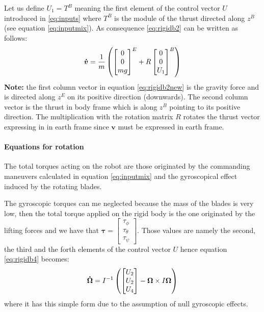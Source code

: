 \noindent
Let us define $U_1 = T^B$ meaning the first element of the control vector $U$ introduced in \eqref{eq:inputs} where $T^B$ is the module of the thrust directed along $z^B$ (see equation \eqref{eq:inputmix}).
As consequence \eqref{eq:rigidb2} can be written as follows:
\vspace{1ex}
\begin{equation}
\vspace{1ex}
\boldsymbol{\dot{v}} = \frac{1}{m}\left(\begin{bmatrix}0\\0\\mg\end{bmatrix}^E + R\begin{bmatrix}0\\0\\U_1\end{bmatrix}^B\right)
\label{eq:rigidb2new}
\end{equation}
\textbf{Note:} the first column vector in equation \eqref{eq:rigidb2new} is the gravity force and is directed along $z^E$ on its positive direction (downwards). The second column vector is the thrust in body frame which is along $z^B$ pointing to its positive direction. The multiplication with the rotation matrix $R$ rotates the thrust vector expressing in in earth frame since $\boldsymbol{v}$ must be expressed in earth frame.\\

\noindent
\paragraph{Equations for rotation}
The total torques acting on the robot are those originated by the commanding maneuvers calculated in equation \eqref{eq:inputmix} and the gyroscopical effect induced by the rotating blades. \par The gyroscopic torques can me neglected because the mass of the blades is very low, then the total torque applied on the rigid body is the one originated by the lifting forces and we have that $\boldsymbol{\tau} = \begin{bmatrix}
\tau_\phi\\\tau_\theta\\\tau_\psi
\end{bmatrix}$. Those values are namely the second, the third and the forth elements of the control vector $U$ hence equation \eqref{eq:rigidb4} becomes:
\vspace{1ex}
\begin{equation}
\vspace{1ex}
\boldsymbol{\dot{\Omega}} =I^{-1}\left(\begin{bmatrix}
U_2\\U_2\\U_4
\end{bmatrix} -\boldsymbol{\Omega} \times I\boldsymbol{\Omega}\right)
\label{eq:rigidb4new}
\end{equation}
where it has this simple form due to the assumption of null gyroscopic effects.\\

